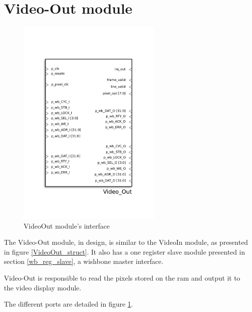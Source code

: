 
\section{Video-Out module}

\begin{figure}[H]
\center
\includegraphics[width=7cm]{figs/Video_out.pdf}
\caption{VideoOut module's interface}
\label{VideoOut_interface}
\end{figure}

The Video-Out module, in design, is similar to the VideoIn module, as presented in figure \ref{VideoOut_struct}. It also has  a one register slave module presented in section \ref{wb_reg_slave}, a wishbone master interface.


Video-Out is responsible to read the pixels stored on the ram and output it to the video display module.

The different ports are detailed in figure \ref{VideoOut_interface}.

